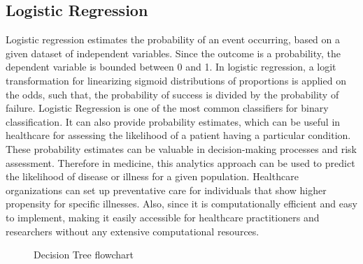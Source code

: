 \documentclass[11pt]{article}
\begin{document}
\subsection{Logistic Regression}
Logistic regression estimates the probability of an event occurring, based on a given dataset of independent variables. Since the outcome is a probability, the dependent variable is bounded between 0 and 1. In logistic regression, a logit transformation for linearizing sigmoid distributions of proportions is applied on the odds, such that, the probability of success is divided by the probability of failure. Logistic Regression is one of the most common classifiers for binary classification. It can also provide probability estimates, which can be useful in healthcare for assessing the likelihood of a patient having a particular condition. These probability estimates can be valuable in decision-making processes and risk assessment. Therefore in medicine, this analytics approach can be used to predict the likelihood of disease or illness for a given population. Healthcare organizations can set up preventative care for individuals that show higher propensity for specific illnesses. Also, since it is computationally efficient and easy to implement, making it easily accessible for healthcare practitioners and researchers without any extensive computational resources.
\begin{figure}[h]
\begin{center}
\end{center}
\caption{Decision Tree flowchart}
\label{experiment1fitness}
\end{figure}
\end{document}
